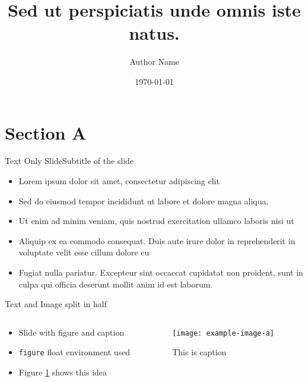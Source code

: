 \documentclass[aspectratio=169]{beamer}
\author{Author Name}
\title{Sed ut perspiciatis unde omnis iste natus.}
\date{\today}
\begin{document}
\titlepage

\section{Section A}
%
%
%
%
%
\begin{frame}{Text Only Slide}{Subtitle of the slide}
    \begin{itemize}
        \item Lorem ipsum dolor sit amet, consectetur adipiscing elit
        \item Sed do eiusmod tempor incididunt ut labore et dolore magna aliqua.
        \item Ut enim ad minim veniam, quis nostrud exercitation ullamco laboris nisi ut
        \item Aliquip ex ea commodo consequat. Duis aute irure dolor in reprehenderit in voluptate velit esse cillum dolore eu
        \item Fugiat nulla pariatur. Excepteur sint occaecat cupidatat non proident, sunt in culpa qui officia deserunt mollit anim id est laborum.
    \end{itemize}
\end{frame}
%
%
%
%
\begin{frame}{Text and Image split in half} %
    \begin{columns}
        \begin{column}{0.49\textwidth}
            \begin{itemize}
                \item Slide with figure and caption
                \item \texttt{figure} float environment used
                \item Figure \ref{fig:fig_label} shows this idea
            \end{itemize}
        \end{column}
        \begin{column}{0.49\textwidth}
            \begin{figure}[h!]
                \centering
                \texttt{[image: example-image-a]}
                \caption{This is caption}
                \label{fig:fig_label}
            \end{figure}
        \end{column}
    \end{columns}
\end{frame} 
%
%
%
%
%
\end{document}
